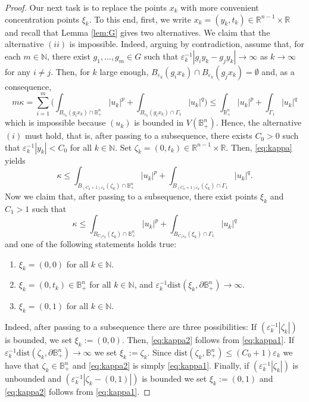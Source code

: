\documentclass[reqno,11pt,oneside]{amsart}
\numberwithin{equation}{section}
\def\D{\mathbb{B}^n_+}
\def\r{\mathbb{R}}
\def\n{\mathbb{N}}
\def\eps{\varepsilon}
\def\dist{\mathrm{dist}}
\begin{document}
\begin{proof}
Our next task is to replace the points $x_k$ with more convenient concentration points $\xi_k$. To this end, first, we 
write $x_k=(y_k,t_k)\in\r^{n-1}\times\r$ and recall that Lemma \ref{lem:G} gives two alternatives. We claim that the alternative $(ii)$ is impossible. Indeed, arguing by contradiction, assume that, for each $m\in\n$, there exist $g_1,\ldots,g_m\in G$ such that $\eps_{k}^{-1}|g_iy_k-g_jy_k|\to\infty$ as $k\to\infty$ for any $i\neq j$. Then, for $k$ large enough, $B_{\eps_k}(g_ix_k)\cap B_{\eps_k}(g_jx_k)=\emptyset$ and, as a consequence,
\begin{equation*}
m\kappa=\sum_{i=1}^m\Big(\int_{B_{\eps_k}(g_ix_k)\cap\D}|u_k|^p+\int_{B_{\eps_k}(g_ix_k)\cap\Gamma_1}|u_k|^q\Big)\leq\int_{\D}|u_k|^p+\int_{\Gamma_1}|u_k|^q
\end{equation*}
which is impossible because $(u_k)$ is bounded in $V(\D)$. Hence, the alternative $(i)$ must hold, that is, after passing to a subsequence, there exists $C_0>0$ such that $\eps_k^{-1}|y_k|<C_0$ for all $k\in\n$. Set $\zeta_k=(0,t_k)\in\r^{n-1}\times\r$. Then, \eqref{eq:kappa} yields
\begin{equation} \label{eq:kappa1}
\kappa\leq \int_{B_{(C_0+1)\eps_k}(\zeta_k)\cap\D}|u_k|^p+\int_{B_{(C_0+1)\eps_k}(\zeta_k)\cap\Gamma_1}|u_k|^q.
\end{equation}
Now we claim that, after passing to a subsequence, there exist points $\xi_k$ and $C_1>1$ such that
\begin{equation} \label{eq:kappa2}
\kappa\leq \int_{B_{C_1\eps_k}(\xi_k)\cap\D}|u_k|^p+\int_{B_{C_1\eps_k}(\xi_k)\cap\Gamma_1}|u_k|^q
\end{equation}
and one of the following statements holds true:
\begin{enumerate}
\item $\xi_k=(0,0)$ for all $k\in\n$.
\item $\xi_k=(0,t_k)\in\D$ for all $k\in\n$, and $\eps_k^{-1}\dist(\xi_k,\partial\D)\to\infty$.
\item $\xi_k=(0,1)$ for all $k\in\n$.
\end{enumerate}
Indeed, after passing to a subsequence there are three possibilities: If $(\eps_k^{-1}|\zeta_k|)$ is bounded, we set $\xi_k:=(0,0)$. Then, \eqref{eq:kappa2} follows from \eqref{eq:kappa1}. If $\eps_k^{-1}\dist(\zeta_k,\partial\D)\to\infty$ we set $\xi_k:=\zeta_k$. Since $\dist(\zeta_k,\D)\leq(C_0+1)\eps_k$ we have that $\zeta_k\in\D$ and \eqref{eq:kappa2} is simply \eqref{eq:kappa1}. Finally, if $(\eps_k^{-1}|\zeta_k|)$ is unbounded and $(\eps_k^{-1}|\zeta_k-(0,1)|)$ is bounded we set $\xi_k:=(0,1)$ and \eqref{eq:kappa2} follows from \eqref{eq:kappa1}.


\end{proof}
\end{document}

